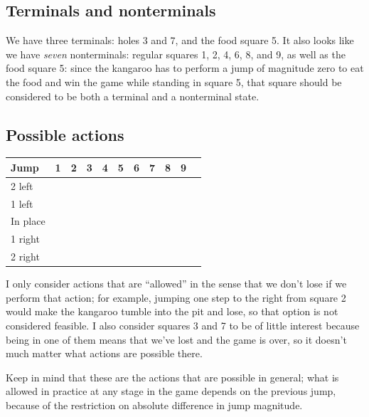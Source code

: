\documentclass[letterpaper, 10pt]{article}
\begin{document}
\begin{multicols*}{2}
\subsection{Terminals and nonterminals}
We have three terminals: holes 3 and 7, and the food square 5. It also looks like we have \emph{seven} nonterminals: regular squares 1, 2, 4, 6, 8, and 9, as well as the food square 5: since the kangaroo has to perform a jump of magnitude zero to eat the food and win the game while standing in square 5, that square should be considered to be both a terminal and a nonterminal state. 

\subsection{Possible actions}
\begin{tabular}{lcccccccccc}
	Jump & 1 & 2 & 3 & 4 & 5 & 6 & 7 & 8 & 9 \\
	\midrule
	2 left   & \checkmark & \checkmark & & \checkmark & & \checkmark & & \checkmark &  \\
	1 left   & \checkmark & \checkmark & & & \checkmark & \checkmark & & & \checkmark \\
	In place & \checkmark & \checkmark & & \checkmark & \checkmark & \checkmark & & \checkmark & \checkmark \\
	1 right  & \checkmark & & & \checkmark & \checkmark & & & \checkmark & \checkmark \\
	2 right  & & \checkmark & & \checkmark & & \checkmark & & \checkmark & \checkmark \\
\end{tabular}

\vspace{10pt}

\noindent 
I only consider actions that are ``allowed'' in the sense that we don't lose if we perform that action; for example, jumping one step to the right from square 2 would make the kangaroo tumble into the pit and lose, so that option is not considered feasible. 
I also consider squares 3 and 7 to be of little interest because being in one of them means that we've lost and the game is over, so it doesn't much matter what actions are possible there. 

Keep in mind that these are the actions that are possible in general; what is allowed in practice at any stage in the game depends on the previous jump, because of the restriction on absolute difference in jump magnitude.


\end{multicols*}
\end{document}
